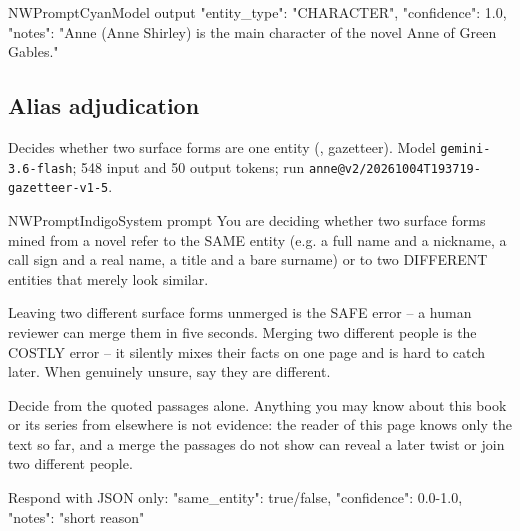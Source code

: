 \begin{nwprompt}{NWPromptCyan}{Model output}
{"entity_type": "CHARACTER", "confidence": 1.0, "notes": "Anne (Anne Shirley) is the main character of the novel Anne of Green Gables."}
\end{nwprompt}

\subsection*{Alias adjudication}
Decides whether two surface forms are one entity (\sys, gazetteer). Model \texttt{gemini-3.6-flash}; 548 input and 50 output tokens; run \nolinkurl{anne@v2/20261004T193719-gazetteer-v1-5}.

\begin{nwprompt}{NWPromptIndigo}{System prompt}
You are deciding whether two surface forms mined from a novel refer to the SAME entity (e.g. a full name and a nickname, a call sign and a real name, a title and a bare surname) or to two DIFFERENT entities that merely look similar.

Leaving two different surface forms unmerged is the SAFE error -- a human reviewer can merge them in five seconds. Merging two different people is the COSTLY error -- it silently mixes their facts on one page and is hard to catch later. When genuinely unsure, say they are different.

Decide from the quoted passages alone. Anything you may know about this book or its series from elsewhere is not evidence: the reader of this page knows only the text so far, and a merge the passages do not show can reveal a later twist or join two different people.

Respond with JSON only: {"same_entity": true/false, "confidence": 0.0-1.0, "notes": "short reason"}
\end{nwprompt}

